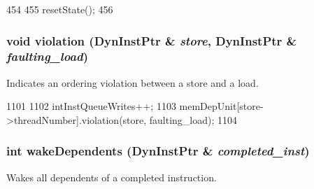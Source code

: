 \begin{DoxyCode}
454 {
455     resetState();
456 }
\end{DoxyCode}
\hypertarget{classInstructionQueue_aeea40175042f18a63a90cbbd7dd451bc}{
\subsubsection[{violation}]{\setlength{\rightskip}{0pt plus 5cm}void violation ({\bf DynInstPtr} \& {\em store}, \/  {\bf DynInstPtr} \& {\em faulting\_\-load})}}
\label{classInstructionQueue_aeea40175042f18a63a90cbbd7dd451bc}
Indicates an ordering violation between a store and a load. 


\begin{DoxyCode}
1101 {
1102     intInstQueueWrites++;
1103     memDepUnit[store->threadNumber].violation(store, faulting_load);
1104 }
\end{DoxyCode}
\hypertarget{classInstructionQueue_aab5cfade3ce4bb4addbf52c7464676d9}{
\subsubsection[{wakeDependents}]{\setlength{\rightskip}{0pt plus 5cm}int wakeDependents ({\bf DynInstPtr} \& {\em completed\_\-inst})}}
\label{classInstructionQueue_aab5cfade3ce4bb4addbf52c7464676d9}
Wakes all dependents of a completed instruction. 


